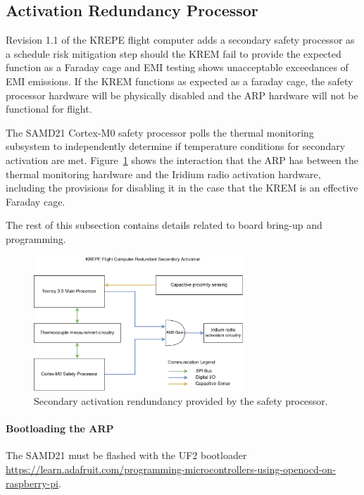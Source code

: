\documentclass{article}
\begin{document}
\subsection{Activation Redundancy Processor}
\label{actred}
Revision 1.1 of the KREPE flight computer adds a secondary safety processor as a schedule risk mitigation step should the KREM fail to provide the expected function as a Faraday cage and EMI testing shows unacceptable exceedances of EMI emissions. If the KREM functions as expected as a faraday cage, the safety processor hardware will be physically disabled and the ARP hardware will not be functional for flight. 

The SAMD21 Cortex-M0 safety processor polls the thermal monitoring subsystem to independently determine if temperature conditions for secondary activation are met. Figure~\ref{fig:actred} shows the interaction that the ARP has between the thermal monitoring hardware and the Iridium radio activation hardware, including the provisions for disabling it in the case that the KREM is an effective Faraday cage.

The rest of this subsection contains details related to board bring-up and programming.


\begin{figure}[H]
  \centering
  \includegraphics[width=0.7\textwidth]{images/redundant-activation.png}
  \caption{Secondary activation rendundancy provided by the safety processor.}
  \label{fig:actred}
\end{figure}

\paragraph{Bootloading the ARP}
The SAMD21 must be flashed with the UF2 bootloader \url{https://learn.adafruit.com/programming-microcontrollers-using-openocd-on-raspberry-pi}.
\end{document}
